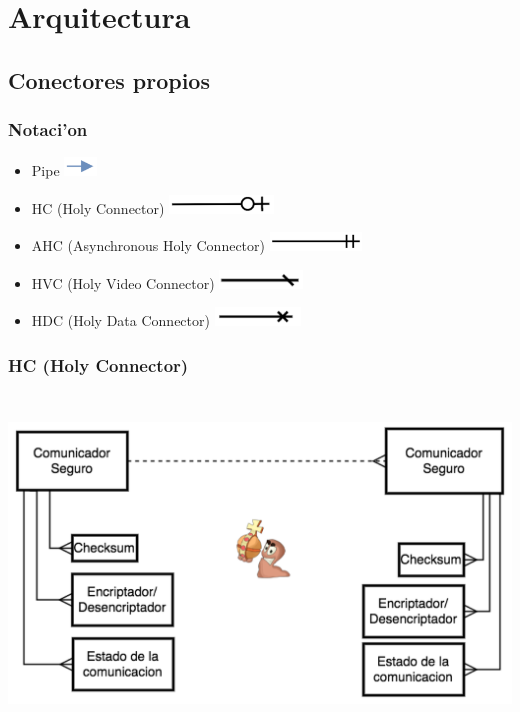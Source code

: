
\section{Arquitectura}
\subsection{Conectores propios}
\subsubsection{Notaci'on}

\begin{itemize}
\item Pipe \includegraphics[height=0.5cm]{diagramas/NPIPE} 
\item HC (Holy Connector) \includegraphics[height=0.5cm]{diagramas/NHC} 
\item AHC (Asynchronous Holy Connector) \includegraphics[height=0.5cm]{diagramas/NHCCA}
\item HVC (Holy Video Connector) \includegraphics[height=0.5cm]{diagramas/NHVC} 
\item HDC (Holy Data Connector) \includegraphics[height=0.5cm]{diagramas/NHDC} 

\end{itemize}

\subsubsection{HC (Holy Connector)}

\includegraphics[height=9cm]{diagramas/HC} 

